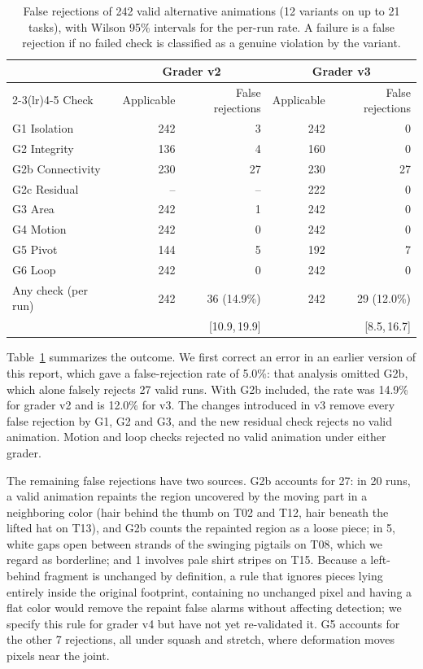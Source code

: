 \documentclass[11pt]{article}
\newcommand{\ci}[2]{\,[#1,\,#2]}
\newcommand{\chk}[1]{\textsf{#1}}
\begin{document}
\begin{table}[t]
\centering
\small
\setlength{\tabcolsep}{4pt}
\begin{tabular}{lrrrr}
\toprule
 & \multicolumn{2}{c}{Grader v2} & \multicolumn{2}{c}{Grader v3} \\
\cmidrule(lr){2-3}\cmidrule(lr){4-5}
Check & Applicable & False rejections & Applicable & False rejections \\
\midrule
\chk{G1} Isolation & 242 & 3 & 242 & 0 \\
\chk{G2} Integrity & 136 & 4 & 160 & 0 \\
\chk{G2b} Connectivity & 230 & 27 & 230 & 27 \\
\chk{G2c} Residual & -- & -- & 222 & 0 \\
\chk{G3} Area & 242 & 1 & 242 & 0 \\
\chk{G4} Motion & 242 & 0 & 242 & 0 \\
\chk{G5} Pivot & 144 & 5 & 192 & 7 \\
\chk{G6} Loop & 242 & 0 & 242 & 0 \\
\midrule
Any check (per run) & 242 & 36 (14.9\%) & 242 & 29 (12.0\%) \\
 & & \ci{10.9}{19.9} & & \ci{8.5}{16.7} \\
\bottomrule
\end{tabular}
\caption{False rejections of 242 valid alternative animations (12 variants on up to 21 tasks), with Wilson 95\% intervals for the per-run rate. A failure is a false rejection if no failed check is classified as a genuine violation by the variant.}
\label{tab:falsefail}
\end{table}

Table~\ref{tab:falsefail} summarizes the outcome. We first correct an error in an earlier version of this report, which gave a false-rejection rate of 5.0\%: that analysis omitted \chk{G2b}, which alone falsely rejects 27 valid runs. With \chk{G2b} included, the rate was 14.9\% for grader v2 and is 12.0\% for v3. The changes introduced in v3 remove every false rejection by \chk{G1}, \chk{G2} and \chk{G3}, and the new residual check rejects no valid animation. Motion and loop checks rejected no valid animation under either grader.

The remaining false rejections have two sources. \chk{G2b} accounts for 27: in 20 runs, a valid animation repaints the region uncovered by the moving part in a neighboring color (hair behind the thumb on T02 and T12, hair beneath the lifted hat on T13), and \chk{G2b} counts the repainted region as a loose piece; in 5, white gaps open between strands of the swinging pigtails on T08, which we regard as borderline; and 1 involves pale shirt stripes on T15. Because a left-behind fragment is unchanged by definition, a rule that ignores pieces lying entirely inside the original footprint, containing no unchanged pixel and having a flat color would remove the repaint false alarms without affecting detection; we specify this rule for grader v4 but have not yet re-validated it. \chk{G5} accounts for the other 7 rejections, all under squash and stretch, where deformation moves pixels near the joint.
\end{document}
